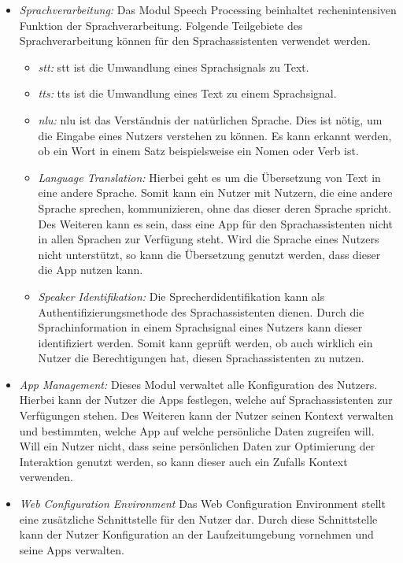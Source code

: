 \begin{itemize}
	\item \textsl{Sprachverarbeitung:} Das Modul Speech Processing beinhaltet rechenintensiven Funktion der Sprachverarbeitung. Folgende Teilgebiete des Sprachverarbeitung können für den Sprachassistenten verwendet werden.
	\begin{itemize}
		\item \textsl{\ac{stt}:} \ac{stt} ist die Umwandlung eines Sprachsignals zu Text.
		\item \textsl{\ac{tts}:} \ac{tts} ist die Umwandlung eines Text zu einem Sprachsignal.
		\item \textsl{\ac{nlu}:} \ac{nlu} ist das Verständnis der natürlichen Sprache. Dies ist nötig, um die Eingabe eines Nutzers verstehen zu können. Es kann erkannt werden, ob ein Wort in einem Satz beispielsweise ein Nomen oder Verb ist. 
		\item \textsl{Language Translation:} Hierbei geht es um die Übersetzung von Text in eine andere Sprache. Somit kann ein Nutzer mit Nutzern, die eine andere Sprache sprechen, kommunizieren, ohne das dieser deren Sprache spricht. Des Weiteren kann es sein, dass eine App für den Sprachassistenten nicht in allen Sprachen zur Verfügung steht. Wird die Sprache eines Nutzers nicht unterstützt, so kann die Übersetzung genutzt werden, dass dieser die App nutzen kann.
		\item \textsl{Speaker Identifikation:} Die Sprecherdidentifikation kann als Authentifizierungsmethode des Sprachassistenten dienen. Durch die Sprachinformation in einem Sprachsignal eines Nutzers kann dieser identifiziert werden. Somit kann geprüft werden, ob auch wirklich ein Nutzer die Berechtigungen hat, diesen Sprachassistenten zu nutzen.
	\end{itemize}
	\item \textsl{App Management: } Dieses Modul verwaltet alle Konfiguration des Nutzers. Hierbei kann der Nutzer die Apps festlegen, welche auf Sprachassistenten zur Verfügungen stehen. Des Weiteren kann der Nutzer seinen Kontext verwalten und bestimmten, welche App auf welche persönliche Daten zugreifen will. Will ein Nutzer nicht, dass seine persönlichen Daten zur Optimierung der Interaktion genutzt werden, so kann dieser auch ein Zufalls Kontext verwenden.
	\item \textsl{Web Configuration Environment} Das Web Configuration Environment stellt eine zusätzliche Schnittstelle für den Nutzer dar. Durch diese Schnittstelle kann der Nutzer Konfiguration an der Laufzeitumgebung vornehmen und seine Apps verwalten. 
\end{itemize}





